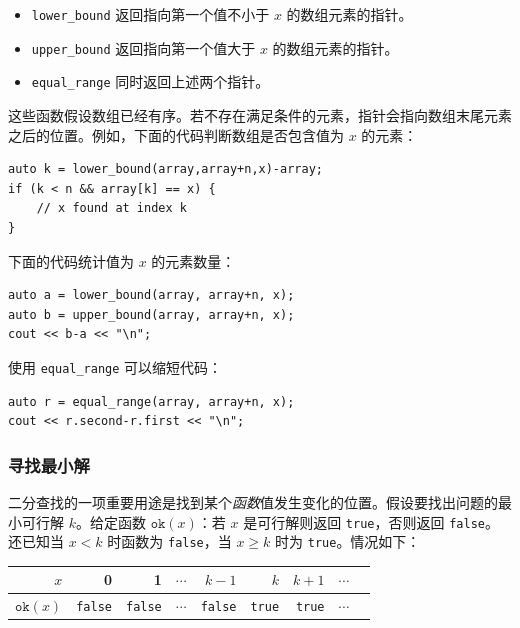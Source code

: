 \begin{itemize}
\item \texttt{lower\_bound} 返回指向第一个值不小于 $x$ 的数组元素的指针。
\item \texttt{upper\_bound} 返回指向第一个值大于 $x$ 的数组元素的指针。
\item \texttt{equal\_range} 同时返回上述两个指针。
\end{itemize}

这些函数假设数组已经有序。若不存在满足条件的元素，指针会指向数组末尾元素之后的位置。例如，下面的代码判断数组是否包含值为 $x$ 的元素：

\begin{lstlisting}
auto k = lower_bound(array,array+n,x)-array;
if (k < n && array[k] == x) {
    // x found at index k
}
\end{lstlisting}

下面的代码统计值为 $x$ 的元素数量：

\begin{lstlisting}
auto a = lower_bound(array, array+n, x);
auto b = upper_bound(array, array+n, x);
cout << b-a << "\n";
\end{lstlisting}

使用 \texttt{equal\_range} 可以缩短代码：

\begin{lstlisting}
auto r = equal_range(array, array+n, x);
cout << r.second-r.first << "\n";
\end{lstlisting}

\subsubsection{寻找最小解}

二分查找的一项重要用途是找到某个\emph{函数}值发生变化的位置。假设要找出问题的最小可行解 $k$。给定函数 $\texttt{ok}(x)$：若 $x$ 是可行解则返回 \texttt{true}，否则返回 \texttt{false}。还已知当 $x<k$ 时函数为 \texttt{false}，当 $x \ge k$ 时为 \texttt{true}。情况如下：

\begin{center}
\begin{tabular}{r|rrrrrrrr}
$x$ & 0 & 1 & $\cdots$ & $k-1$ & $k$ & $k+1$ & $\cdots$ \\
\hline
$\texttt{ok}(x)$ & \texttt{false} & \texttt{false}
& $\cdots$ & \texttt{false} & \texttt{true} & \texttt{true} & $\cdots$ \\
\end{tabular}
\end{center}

